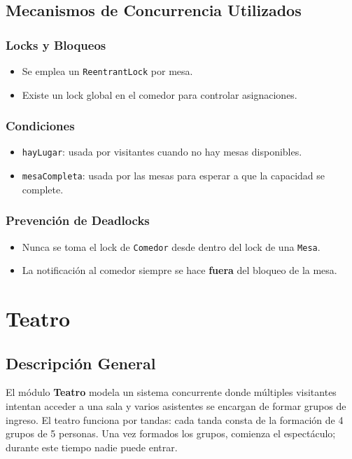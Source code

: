 \documentclass[12pt,a4paper]{article}
\begin{document}
\subsection{Mecanismos de Concurrencia Utilizados}

\subsubsection*{Locks y Bloqueos}
\begin{itemize}
    \item Se emplea un \texttt{ReentrantLock} por mesa.
    \item Existe un lock global en el comedor para controlar asignaciones.
\end{itemize}

\subsubsection*{Condiciones}
\begin{itemize}
    \item \texttt{hayLugar}: usada por visitantes cuando no hay mesas disponibles.
    \item \texttt{mesaCompleta}: usada por las mesas para esperar a que la capacidad se complete.
\end{itemize}

\subsubsection*{Prevención de Deadlocks}
\begin{itemize}
    \item Nunca se toma el lock de \texttt{Comedor} desde dentro del lock de una \texttt{Mesa}.
    \item La notificación al comedor siempre se hace \textbf{fuera} del bloqueo de la mesa.
\end{itemize}



\newpage
\section{Teatro }
\subsection{Descripción General}

El módulo \textbf{Teatro} modela un sistema concurrente donde múltiples visitantes intentan acceder a una sala y varios asistentes se encargan de formar grupos de ingreso. El teatro funciona por tandas: cada tanda consta de la formación de 4 grupos de 5 personas. Una vez formados los grupos, comienza el espectáculo; durante este tiempo nadie puede entrar.
\end{document}
